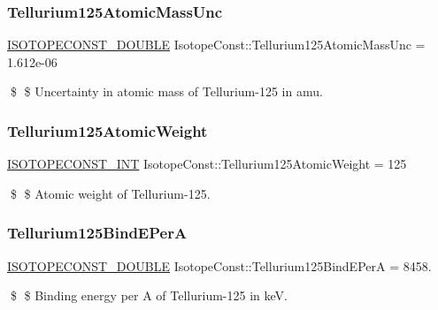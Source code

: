 \subsubsection{\texorpdfstring{Tellurium125\+Atomic\+Mass\+Unc}{Tellurium125AtomicMassUnc}}
{\footnotesize\ttfamily \mbox{\hyperlink{group___isotope_const-_macros_ga8f45a7272ce02c0b4c65c44636ed719a}{I\+S\+O\+T\+O\+P\+E\+C\+O\+N\+S\+T\+\_\+\+D\+O\+U\+B\+LE}} Isotope\+Const\+::\+Tellurium125\+Atomic\+Mass\+Unc = 1.\+612e-\/06}

\$ \$ Uncertainty in atomic mass of Tellurium-\/125 in amu. \mbox{\label{group___isotope_const-_tellurium-_te125_ga6c79c31eb71b437dca6c7b08a2fa30fe}} 
\subsubsection{\texorpdfstring{Tellurium125\+Atomic\+Weight}{Tellurium125AtomicWeight}}
{\footnotesize\ttfamily \mbox{\hyperlink{group___isotope_const-_macros_ga5f18360b3e99483a35c32d789e62621c}{I\+S\+O\+T\+O\+P\+E\+C\+O\+N\+S\+T\+\_\+\+I\+NT}} Isotope\+Const\+::\+Tellurium125\+Atomic\+Weight = 125}

\$ \$ Atomic weight of Tellurium-\/125. \mbox{\label{group___isotope_const-_tellurium-_te125_ga64599edb8b5eec79331bc93f9956d3ed}} 
\subsubsection{\texorpdfstring{Tellurium125\+Bind\+E\+PerA}{Tellurium125BindEPerA}}
{\footnotesize\ttfamily \mbox{\hyperlink{group___isotope_const-_macros_ga8f45a7272ce02c0b4c65c44636ed719a}{I\+S\+O\+T\+O\+P\+E\+C\+O\+N\+S\+T\+\_\+\+D\+O\+U\+B\+LE}} Isotope\+Const\+::\+Tellurium125\+Bind\+E\+PerA = 8458.}

\$ \$ Binding energy per A of Tellurium-\/125 in keV. \mbox{\label{group___isotope_const-_tellurium-_te125_ga4646f97e18df3791743643c4fa7e0320}} 
